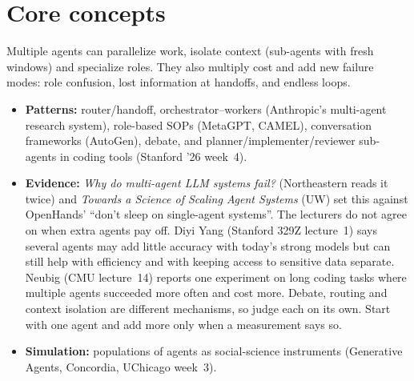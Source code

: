 \documentclass[10pt,oneside]{report}
\begin{document}
\section{Core concepts}
Multiple agents can parallelize work, isolate context (sub-agents with fresh windows) and specialize roles. They also multiply cost and add new failure modes: role confusion, lost information at handoffs, and endless loops.
\begin{itemize}
\item \textbf{Patterns:} router/handoff, orchestrator--workers (Anthropic's multi-agent research system), role-based SOPs (MetaGPT, CAMEL), conversation frameworks (AutoGen), debate, and planner/implementer/reviewer sub-agents in coding tools (Stanford '26 week~4).
\item \textbf{Evidence:} \emph{Why do multi-agent LLM systems fail?} (Northeastern reads it twice) and \emph{Towards a Science of Scaling Agent Systems} (UW) set this against OpenHands' ``don't sleep on single-agent systems''. The lecturers do not agree on when extra agents pay off. Diyi Yang (Stanford 329Z lecture~1) says several agents may add little accuracy with today's strong models but can still help with efficiency and with keeping access to sensitive data separate. Neubig (CMU lecture~14) reports one experiment on long coding tasks where multiple agents succeeded more often and cost more. Debate, routing and context isolation are different mechanisms, so judge each on its own. Start with one agent and add more only when a measurement says so.
\item \textbf{Simulation:} populations of agents as social-science instruments (Generative Agents, Concordia, UChicago week~3).
\end{itemize}
\end{document}

